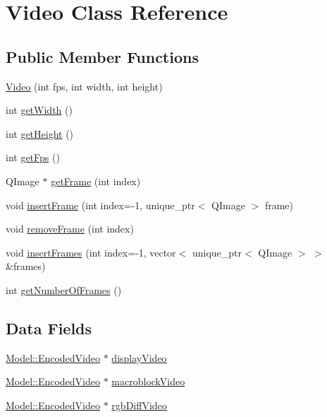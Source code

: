 \hypertarget{classGUI_1_1Player_1_1Video}{}\section{Video Class Reference}
\label{classGUI_1_1Player_1_1Video}
\subsection*{Public Member Functions}
\begin{DoxyCompactItemize}
\item 
\hyperlink{classGUI_1_1Player_1_1Video_ab82b351b35612f4226f75726d958831b}{Video} (int fps, int width, int height)
\item 
int \hyperlink{classGUI_1_1Player_1_1Video_a67a0997183f24da19b776d96c1052998}{get\+Width} ()
\item 
int \hyperlink{classGUI_1_1Player_1_1Video_a07efb2a4e9a982688c8bb3c3f21d1092}{get\+Height} ()
\item 
int \hyperlink{classGUI_1_1Player_1_1Video_a519ad5c0664b9de28c1a6d9dc77f959d}{get\+Fps} ()
\item 
Q\+Image $\ast$ \hyperlink{classGUI_1_1Player_1_1Video_aa350d9b9ba7bad72aeda171dcc537c10}{get\+Frame} (int index)
\item 
void \hyperlink{classGUI_1_1Player_1_1Video_a34274f56faa98faa9697ef24e6fe99ef}{insert\+Frame} (int index=-\/1, unique\+\_\+ptr$<$ Q\+Image $>$ frame)
\item 
void \hyperlink{classGUI_1_1Player_1_1Video_a2467a8d0c175fdcbacea59e9955d88a9}{remove\+Frame} (int index)
\item 
void \hyperlink{classGUI_1_1Player_1_1Video_aa6207c0d55d5353cd1df573ae326f602}{insert\+Frames} (int index=-\/1, vector$<$ unique\+\_\+ptr$<$ Q\+Image $>$ $>$ \&frames)
\item 
int \hyperlink{classGUI_1_1Player_1_1Video_a038091d64aa83552571228512789d5ee}{get\+Number\+Of\+Frames} ()
\end{DoxyCompactItemize}
\subsection*{Data Fields}
\begin{DoxyCompactItemize}
\item 
\hyperlink{classModel_1_1EncodedVideo}{Model\+::\+Encoded\+Video} $\ast$ \hyperlink{classGUI_1_1Player_1_1Video_ab3171c486c08dcb68f05c418ec4c17ab}{display\+Video}
\item 
\hyperlink{classModel_1_1EncodedVideo}{Model\+::\+Encoded\+Video} $\ast$ \hyperlink{classGUI_1_1Player_1_1Video_ac579683bc7b2499eed6704c87a211234}{macroblock\+Video}
\item 
\hyperlink{classModel_1_1EncodedVideo}{Model\+::\+Encoded\+Video} $\ast$ \hyperlink{classGUI_1_1Player_1_1Video_aa0602ff7e1e4796c78aa15520224b447}{rgb\+Diff\+Video}
\end{DoxyCompactItemize}


